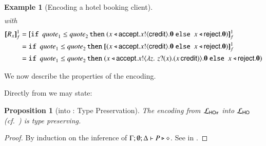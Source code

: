 \documentclass[preprint,11pt]{elsarticle}
\newtheorem{proposition}{Proposition}[section]
\newtheorem{example}{Example}[section]
\newcommand{\Quotev}{\mathit{quote}}
\newcommand{\accept}{\mathsf{accept}}
\newcommand{\reject}{\mathsf{reject}}
\newcommand{\creditc}{\mathsf{credit}}
\begin{document}
{\begin{example}[Encoding a hotel booking client]
\begin{align*}
\end{align*}
with 
\begin{align*}
\pmapp{R_x}{1}{f} & =  \pmapp{\If\ \Quotev_1 \leq \Quotev_2 \, \Then  (\bsel{x}{\accept} \bout{x}{\creditc} \inact \  \Else \ \bsel{x}{\reject} \inact)}{1}{f}
\\
 & =  \If\ \Quotev_1 \leq \Quotev_2 \, \Then  \pmapp{(\bsel{x}{\accept} \bout{x}{\creditc} \inact \  \Else \ \bsel{x}{\reject} \inact)}{1}{f}
\\
 & =  \If\ \Quotev_1 \leq \Quotev_2 \, \Then  (\bsel{x}{\accept} \bout{x}{ \abs{z}{\,\binp{z}{x} (\appl{x}{\creditc})} }  \inact \  \Else \ \bsel{x}{\reject} \inact)
\end{align*}
\end{example}

We now describe the properties of the encoding. 
{Directly from  we may state:

\begin{proposition}[\HOp into \HO: Type Preservation]
\label{prop:typepres_HOp_to_HO}
The encoding from $\mathcal{L}_{\mathsf{HO}\pi}$ into $\mathcal{L}_{\mathsf{HO}}$ (cf.~)
is type preserving.
\end{proposition}}

\begin{proof}
By induction on the inference of $\Gamma; \emptyset; \Delta \vdash P \triangleright \diamond$.
See  in .
\end{proof}

}
\end{document}
